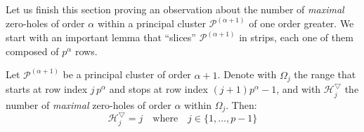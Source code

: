 Let us finish this section proving an observation about the number
of \emph{maximal} zero-holes of order $\alpha$ within a principal
cluster $\mathcal{P}^{(\alpha+1)}$ of one order greater. We start with
an important lemma that ``slices'' $\mathcal{P}^{(\alpha+1)}$ in strips,
each one of them composed of $p^{\alpha}$ rows.

\begin{lemma}
    Let $\mathcal{P}^{(\alpha+1)}$ be a principal cluster of order $\alpha+1$. 
    Denote with $\Omega_{j}$ the range that starts at row index $j\,p^{\alpha}$ and stops at
    row index $(j+1)p^{\alpha} -1$, and with $\mathcal{H}_{j}^{\bigtriangledown}$ the number
    of \emph{maximal} zero-holes of order $\alpha$ within $\Omega_{j}$. 
    Then: 
    \begin{displaymath}
        \mathcal{H}_{j}^{\bigtriangledown}=j \quad\text{where}\quad j\in \lbrace 1, \ldots, p-1 \rbrace
    \end{displaymath}
\end{lemma}

